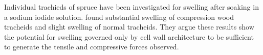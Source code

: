 Individual trachieds of spruce have been investigated for swelling after soaking in a sodium iodide solution. \citet{Burgert_2007} found substantial swelling of compression wood tracheids and slight swelling of normal tracheids. They argue these results show the potential for swelling governed only by cell wall architecture to be sufficient to generate the tensile and compressive forces observed.
